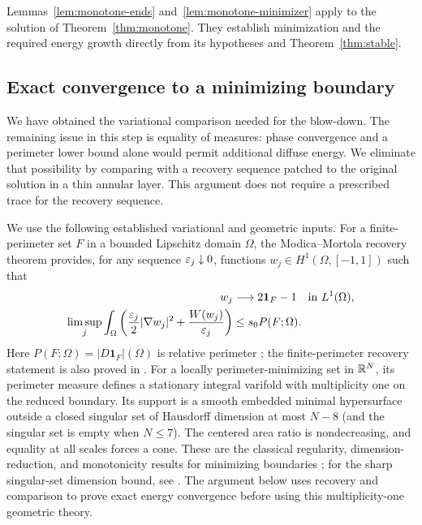 Lemmas~\ref{lem:monotone-ends} and~\ref{lem:monotone-minimizer} apply to
the solution of Theorem~\ref{thm:monotone}.  They establish minimization
and the required energy growth directly from its hypotheses and
Theorem~\ref{thm:stable}.

\subsection{Exact convergence to a minimizing boundary}

We have obtained the variational comparison needed for the blow-down.
The remaining issue in this step is equality of measures: phase
convergence and a perimeter lower bound alone would permit additional
diffuse energy.  We eliminate that possibility by comparing with a
recovery sequence patched to the original solution in a thin annular
layer.  This argument does not require a prescribed trace for the
recovery sequence.

We use the following established variational and geometric inputs.
For a finite-perimeter set $F$ in a bounded Lipschitz domain $\Omega$,
the Modica--Mortola recovery theorem provides, for any sequence
$\varepsilon_j\downarrow0$, functions
$w_j\in H^1(\Omega,[-1,1])$ such that
\begin{equation}
 \begin{split}
 w_j&\longrightarrow 2\mathbf1_F-1\quad\text{in }L^1(\Omega),\\
 \limsup_j\int_\Omega
   \left(\frac{\varepsilon_j}2|\nabla w_j|^2+\frac{W(w_j)}{\varepsilon_j}\right)
   &\le s_0 P(F;\Omega).
 \end{split}
 \label{eq:monotone-recovery}
\end{equation}
Here $P(F;\Omega)=|D\mathbf1_F|(\Omega)$ is relative perimeter
\citep{ModicaMortola1977}; the finite-perimeter recovery statement is
also proved in \citet[Section~3, pp.~140--141]{Modica1987}.
For a locally perimeter-minimizing set in
$\mathbb R^N$, its perimeter measure defines a stationary integral varifold
with multiplicity one on the reduced boundary.  Its support is a smooth
embedded minimal hypersurface outside a closed singular set of Hausdorff
dimension at most $N-8$ (and the singular set is empty when $N\le7$).
The centered area ratio is nondecreasing, and equality at all scales
forces a cone.  These are the classical regularity, dimension-reduction,
and monotonicity results for minimizing boundaries
\citep{Federer1969,Giusti1984,Simons1968}; for the sharp singular-set
dimension bound, see \citet[Theorem~1, p.~769]{Federer1970}.
The argument below uses
recovery and comparison to prove exact energy convergence before using
this multiplicity-one geometric theory.


